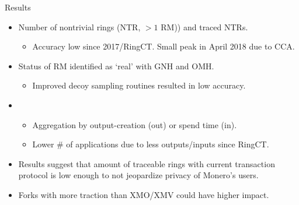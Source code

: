 \begin{columns}[t]
\begin{column}{.47\textwidth}
\begin{block}{Results}\vspace*{-10pt}
    \newcommand{\qrMacro}[1]{\node[anchor=north east,fill=white, inner sep=2pt, xshift=-4pt,yshift=-4pt] at (rel axis cs:1.0,1.0) {\qrcode[height=22mm]{#1}};}
    \begin{itemize}
        \item Number of nontrivial rings (NTR, $>1$ RM)) and traced NTRs.
        \begin{itemize}
            \item Accuracy low since 2017/RingCT. Small peak in April 2018 due to CCA.
        \end{itemize}
    \end{itemize}
    \begin{center}
    \end{center}
    \begin{itemize}
        \item Status of RM identified as `real' with GNH and OMH.
        \begin{itemize}
            \item Improved decoy sampling routines resulted in low accuracy.
        \end{itemize}
    \end{itemize}
    \begin{center}
        
    \end{center}
    \begin{itemize}
        \item[]\begin{itemize} %
            \item Aggregation by output-creation (out) or spend time (in).
            \item Lower \# of applications due to less outputs/inputs since RingCT.
        \end{itemize}
    \end{itemize}
    \begin{center}
        
    \end{center}
    \begin{itemize}
        \item Results suggest that amount of traceable rings with current transaction protocol is low enough to not jeopardize privacy of Monero's users.
         \item Forks with more traction than XMO/XMV could have higher impact. 
    \end{itemize}
\end{block}
\end{column}
\end{columns}
    \vspace*{-10pt}
    
    
